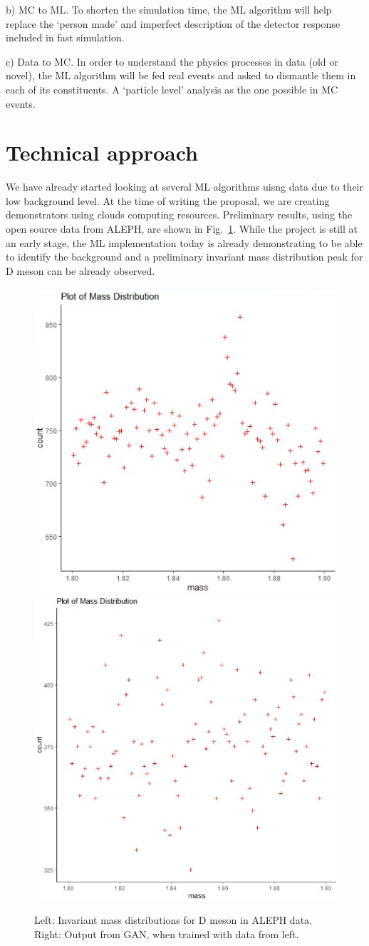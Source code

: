b) MC to ML. To shorten the simulation time, the ML algorithm will help replace the `person made' and imperfect description of the detector response included in fast simulation.  

c) Data to MC. In order to understand the physics processes in data (old or novel), the ML algorithm will be fed real events and asked to dismantle them in each of its constituents. A `particle level' analysis as the one possible in MC events. 

\section{Technical approach}
We have already started looking at several ML algorithms uisng \eecol data due to their low background level. At the time of writing the proposal, we are creating demonstrators using clouds computing resources. Preliminary results, using the open source {\eecol} data from ALEPH, are shown in Fig.~\ref{fig:concept}. While the project is still at an early stage, the ML implementation today is already demonstrating to be able to identify the background and a preliminary invariant mass distribution peak for D meson can be already observed. 


\begin{figure}[!ht]
\begin{center}
\includegraphics[width=.4\textwidth]{figures/Fig1_massDFromDataAleph}
\includegraphics[width=.4\textwidth]{figures/Fig1_massDFromGAN100kEntry}
\caption{Left: Invariant mass distributions for D meson in {\eecol} ALEPH data. Right: Output from GAN, when trained with data from left. }
\label{fig:concept}
\end{center}
\end{figure}

\clearpage



